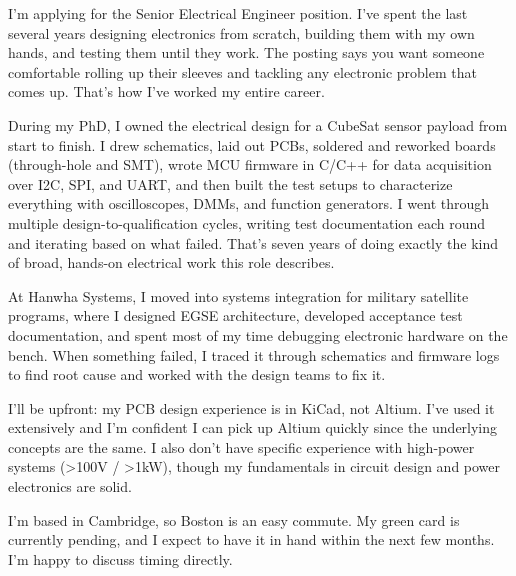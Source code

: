 \documentclass[letterpaper,11pt]{moderncv}
\date{\today}
\begin{document}
\makelettertitle

I'm applying for the Senior Electrical Engineer position. I've spent the last several years designing electronics from scratch, building them with my own hands, and testing them until they work. The posting says you want someone comfortable rolling up their sleeves and tackling any electronic problem that comes up. That's how I've worked my entire career.

During my PhD, I owned the electrical design for a CubeSat sensor payload from start to finish. I drew schematics, laid out PCBs, soldered and reworked boards (through-hole and SMT), wrote MCU firmware in C/C++ for data acquisition over I2C, SPI, and UART, and then built the test setups to characterize everything with oscilloscopes, DMMs, and function generators. I went through multiple design-to-qualification cycles, writing test documentation each round and iterating based on what failed. That's seven years of doing exactly the kind of broad, hands-on electrical work this role describes.

At Hanwha Systems, I moved into systems integration for military satellite programs, where I designed EGSE architecture, developed acceptance test documentation, and spent most of my time debugging electronic hardware on the bench. When something failed, I traced it through schematics and firmware logs to find root cause and worked with the design teams to fix it.

I'll be upfront: my PCB design experience is in KiCad, not Altium. I've used it extensively and I'm confident I can pick up Altium quickly since the underlying concepts are the same. I also don't have specific experience with high-power systems (>100V / >1kW), though my fundamentals in circuit design and power electronics are solid.

I'm based in Cambridge, so Boston is an easy commute. My green card is currently pending, and I expect to have it in hand within the next few months. I'm happy to discuss timing directly.

\makeletterclosing
\end{document}
